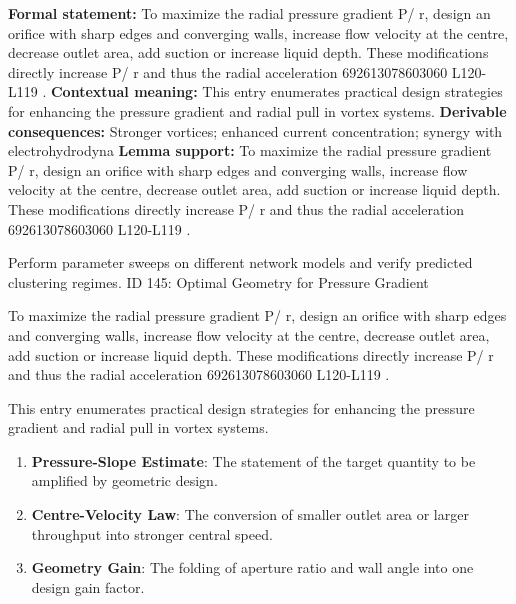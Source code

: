 \begingroup\footnotesize\setlength{\emergencystretch}{3em}\sloppy
\textbf{Formal statement:} To maximize the radial pressure gradient  P/ r, design an orifice with sharp edges and converging walls, increase flow velocity at the centre, decrease outlet area, add suction or increase liquid depth. These modifications directly increase  P/ r and thus the radial acceleration 692613078603060 L120-L119 .
\textbf{Contextual meaning:} This entry enumerates practical design strategies for enhancing the pressure gradient and radial pull in vortex systems.
\textbf{Derivable consequences:} Stronger vortices; enhanced current concentration; synergy with electrohydrodyna
\textbf{Lemma support:} To maximize the radial pressure gradient  P/ r, design an orifice with sharp edges and converging walls, increase flow velocity at the centre, decrease outlet area, add suction or increase liquid depth. These modifications directly increase  P/ r and thus the radial acceleration 692613078603060 L120-L119 .\par
\endgroup

Perform parameter sweeps on different network models and verify predicted clustering regimes. ID 145: Optimal Geometry for Pressure Gradient

To maximize the radial pressure gradient  P/ r, design an orifice with sharp edges and converging walls, increase flow velocity at the centre, decrease outlet area, add suction or increase liquid depth. These modifications directly increase  P/ r and thus the radial acceleration 692613078603060 L120-L119 .

This entry enumerates practical design strategies for enhancing the pressure gradient and radial pull in vortex systems.
\endgroup

\begin{enumerate}[leftmargin=1.6em,itemsep=6pt,topsep=4pt]
\item \textbf{Pressure-Slope Estimate}: The statement of the target quantity to be amplified by geometric design.
\item \textbf{Centre-Velocity Law}: The conversion of smaller outlet area or larger throughput into stronger central speed.
\item \textbf{Geometry Gain}: The folding of aperture ratio and wall angle into one design gain factor.
\end{enumerate}

